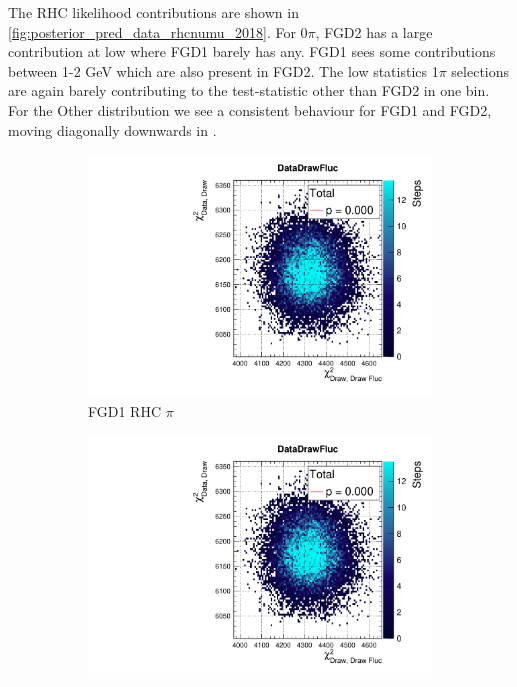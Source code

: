 The \numu RHC likelihood contributions are shown in \autoref{fig:posterior_pred_data_rhcnumu_2018}. For 0$\pi$, FGD2 has a large contribution at low \pmu where FGD1 barely has any. FGD1 sees some contributions between 1-2 GeV which are also present in FGD2. The low statistics 1$\pi$ selections are again barely contributing to the test-statistic other than FGD2 in one bin. For the Other distribution we see a consistent behaviour for FGD1 and FGD2, moving diagonally downwards in \pmu \cosmu.
\begin{figure}[h]
	\begin{subfigure}[t]{0.32\textwidth}
		\includegraphics[width=\textwidth, trim={20mm 6mm 4mm 11mm}, clip,page=115]{figures/mach3/2018/data/2018a_FixedCov_RedCov_Mpi_Data_merge_PostPredStore_FullLLH_procs}
		\caption{FGD1 RHC $\pi$}
	\end{subfigure}
	\begin{subfigure}[t]{0.32\textwidth}
		\includegraphics[width=\textwidth, trim={20mm 6mm 4mm 11mm}, clip,page=124]{figures/mach3/2018/data/2018a_FixedCov_RedCov_Mpi_Data_merge_PostPredStore_FullLLH_procs}

\end{subfigure}
\end{figure}
